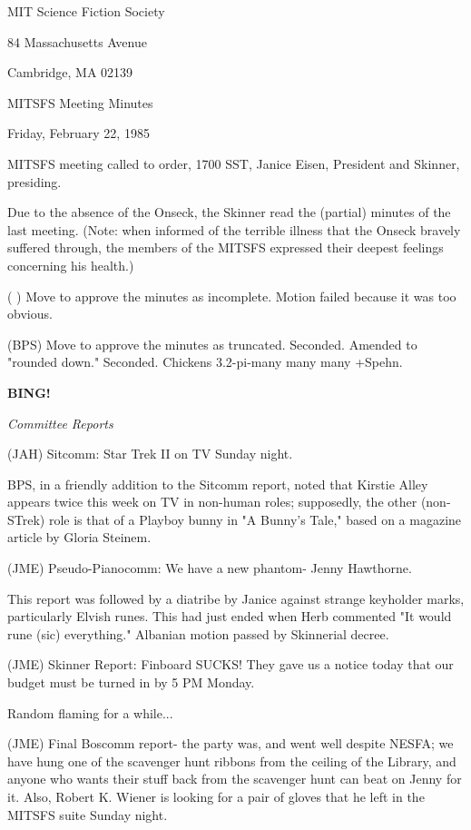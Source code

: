 \documentclass[12pt]{article}
\newcommand{\bing}{{\bf BING!} }
\newcommand{\goto}[1]{\bing \vskip 12pt \centerline{{\em{#1}}}}
\begin{document}
\begin{center}

MIT Science Fiction Society 

84 Massachusetts Avenue

Cambridge, MA 02139

\vspace{12pt}

MITSFS Meeting Minutes 

Friday, February 22, 1985

\end{center}
 
\vspace{18pt}

\setlength{\parskip}{6pt}

\noindent
MITSFS meeting called to order, 1700 SST,
Janice Eisen, President and Skinner, presiding.

Due to the absence of the Onseck, the Skinner read the (partial) minutes of the last meeting. (Note: when informed of the terrible illness that the Onseck bravely suffered through, the members of the MITSFS expressed their deepest feelings concerning his health.)

( ) Move to approve the minutes as incomplete. Motion failed because it was too obvious.

(BPS) Move to approve the minutes as truncated. Seconded. Amended to "rounded down." Seconded. Chickens 3.2-pi-many many many +Spehn.

\goto{Committee Reports}

(JAH) Sitcomm: Star Trek II on TV Sunday night.

BPS, in a friendly addition to the Sitcomm report, noted that Kirstie Alley appears twice this week on TV in non-human roles; supposedly, the other (non-STrek) role is that of a Playboy bunny in "A Bunny's Tale," based on a magazine article by Gloria Steinem.

(JME) Pseudo-Pianocomm: We have a new phantom- Jenny Hawthorne.

This report was followed by a diatribe by Janice against strange keyholder marks, particularly Elvish runes. This had just ended when Herb commented "It would rune (sic) everything." Albanian motion passed by Skinnerial decree.

(JME) Skinner Report: Finboard SUCKS! They gave us a notice today that our budget must be turned in by 5 PM Monday.

Random flaming for a while...

(JME) Final Boscomm report- the party was, and went well despite NESFA; we have hung one of the scavenger hunt ribbons from the ceiling of the Library, and anyone who wants their stuff back from the scavenger hunt can beat on Jenny for it. Also, Robert K. Wiener is looking for a pair of gloves that he left in the MITSFS suite Sunday night.
\end{document}
